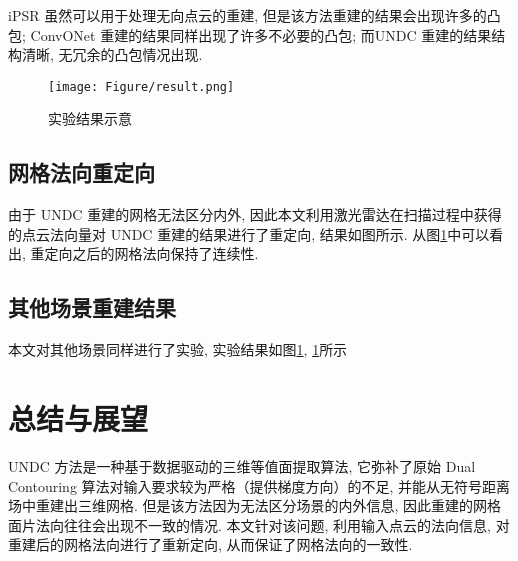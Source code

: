 iPSR 虽然可以用于处理无向点云的重建, 但是该方法重建的结果会出现许多的凸包; ConvONet 重建的结果同样出现了许多不必要的凸包; 而UNDC 重建的结果结构清晰, 无冗余的凸包情况出现. 

\begin{figure}[H]
	\center
	\texttt{[image: Figure/result.png]}
	\centering
	\caption{实验结果示意}\label{fig:fig-result}
\end{figure}

\subsection{网格法向重定向} \label{reorientation}
由于 UNDC 重建的网格无法区分内外, 因此本文利用激光雷达在扫描过程中获得的点云法向量对 UNDC 重建的结果进行了重定向, 结果如图所示. 从图\ref{fig:fig-result}中可以看出, 重定向之后的网格法向保持了连续性. 

\subsection{其他场景重建结果}

本文对其他场景同样进行了实验, 实验结果如图\ref{}, \ref{}所示


\section{总结与展望}
UNDC 方法是一种基于数据驱动的三维等值面提取算法, 它弥补了原始 Dual Contouring 算法对输入要求较为严格（提供梯度方向）的不足, 并能从无符号距离场中重建出三维网格. 
但是该方法因为无法区分场景的内外信息, 因此重建的网格面片法向往往会出现不一致的情况. 
本文针对该问题, 利用输入点云的法向信息, 对重建后的网格法向进行了重新定向, 从而保证了网格法向的一致性. 

\printbibliography%
